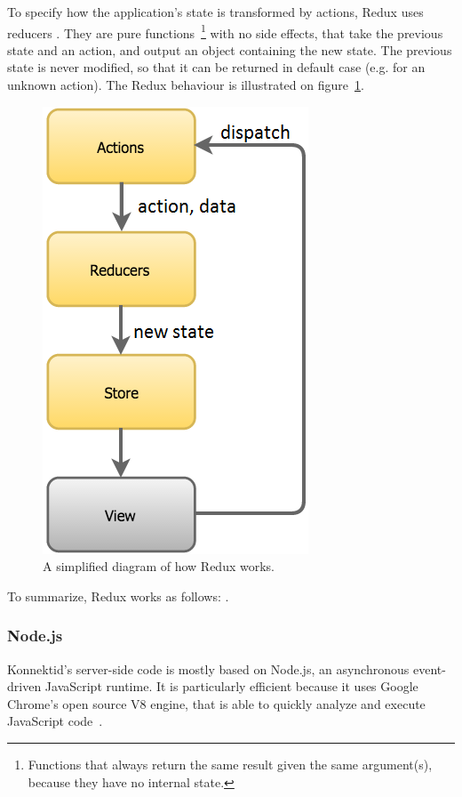 To specify how the application's state is transformed by actions, Redux uses \guillemotleft{} reducers \guillemotright{}. They are pure functions~\footnote{Functions that always return the same result given the same argument(s), because they have no internal state.} with no side effects, that take the previous state and an action, and output an object containing the new state. The previous state is never modified, so that it can be returned in default case (e.g. for an unknown action). The Redux behaviour is illustrated on {\sc figure}~\ref{fig:reduxSumup}.

\begin{figure}[H]
    \centering
    \includegraphics[scale=0.7]{figure/reduxFlow.png}
    \caption{A simplified diagram of how Redux works.}
    \label{fig:reduxSumup}
\end{figure}

To summarize, Redux works as follows: .

\subsubsection{Node.js}
\label{sssec:node}

Konnektid's server-side code is mostly based on Node.js, an asynchronous event-driven JavaScript runtime. It is particularly efficient because it uses Google Chrome's open source V8 engine, that is able to quickly analyze and execute JavaScript code~\cite{v8}.

